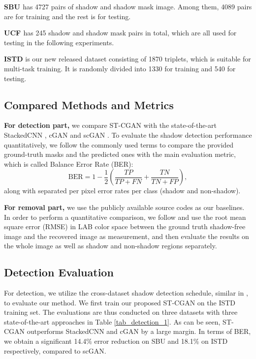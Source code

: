 \documentclass[10pt,twocolumn,letterpaper]{article}
\begin{document}
\noindent \textbf{SBU \cite{vicente2016large}} has 4727 pairs of shadow and shadow mask image. Among them, 4089 pairs are for training and the rest is for testing.

\noindent \textbf{UCF \cite{zhu2010learning}} has 245 shadow and shadow mask pairs in total, which are all used for testing in the following experiments.

\noindent \textbf{ISTD} is our new released dataset consisting of 1870 triplets, which is suitable for multi-task training. It is randomly divided into 1330 for training and 540 for testing.

\vspace{-5pt}
\subsection{Compared Methods and Metrics}
\noindent \textbf{For detection part,} we compare ST-CGAN with the state-of-the-art StackedCNN \cite{vicente2016large}, cGAN \cite{nguyen2017shadow} and scGAN \cite{nguyen2017shadow}. To evaluate the shadow detection performance quantitatively, we follow the commonly used terms \cite{nguyen2017shadow} to compare the provided ground-truth masks and the predicted ones with the main evaluation metric, which is called Balance Error Rate (BER):
\begin{equation}
\mathrm{BER} = 1 - \frac{1}{2}(\frac{TP}{TP + FN} + \frac{TN}{TN + FP}),
\end{equation}
along with separated per pixel error rates per class (shadow and non-shadow).

\noindent \textbf{For removal part,} we use the publicly available source codes \cite{guo2013paired,yang2012shadow,gong2014interactive} as our baselines. In order to perform a quantitative comparison, we follow \cite{guo2013paired,qudeshadownet} and use the root mean square error (RMSE) in LAB color space between the ground truth shadow-free image and the recovered image as measurement, and then evaluate the results on the whole image as well as shadow and non-shadow regions separately.



\subsection{Detection Evaluation}
For detection, we utilize the cross-dataset shadow detection schedule, similar in \cite{nguyen2017shadow}, to evaluate our method. We first train our proposed ST-CGAN on the ISTD training set. The evaluations are thus conducted on three datasets with three state-of-the-art approaches in Table \ref{tab_detection_1}. As can be seen, ST-CGAN outperforms StackedCNN and cGAN by a large margin. In terms of BER, we obtain a significant 14.4\% error reduction on SBU and 18.1\% on ISTD respectively, compared to scGAN. 
\end{document}
